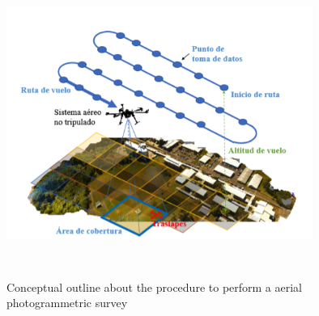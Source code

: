 \begin{figure}[H]
\centering
\includegraphics[width=10cm,height=10cm,keepaspectratio]{imagenes/Photogram.png}
\caption{Conceptual outline about the procedure to perform a aerial photogrammetric survey}
\label{fig:photogrametry}
\end{figure}